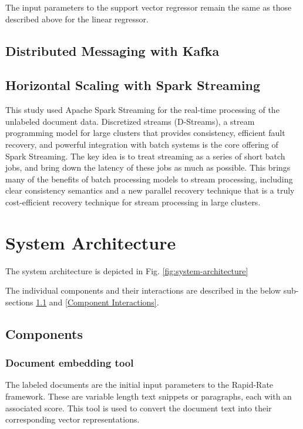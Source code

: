 \documentclass[conference]{IEEEtran}
\begin{document}
The input parameters to the support vector regressor remain the same as those described above for the linear regressor.


\subsection{Distributed Messaging with Kafka}


\subsection{Horizontal Scaling with Spark Streaming}
This study used Apache Spark Streaming for the real-time processing of the unlabeled document data. Discretized streams (D-Streams), a stream programming model for large clusters that provides consistency, efficient fault recovery, and powerful integration with batch systems is the core offering of Spark Streaming. The key idea is to treat streaming as a series of short batch jobs, and bring down the latency of these jobs as much as possible. This brings many of the benefits of batch processing models to stream processing, including clear consistency semantics and a new parallel recovery technique that is a truly cost-efficient recovery technique for stream processing in large clusters\cite{zaharia2012discretized}.

\section{System Architecture}
The system architecture is depicted in Fig. \ref{fig:system-architecture}

The individual components and their interactions are described in the below sub-sections \ref{Components} and \ref{Component Interactions}.

\subsection{Components} \label{Components}

\subsubsection{Document embedding tool}
The labeled documents are the initial input parameters to the Rapid-Rate framework. These are variable length text snippets or paragraphs, each with an associated score. This tool is used to convert the document text into their corresponding vector representations.
\end{document}
